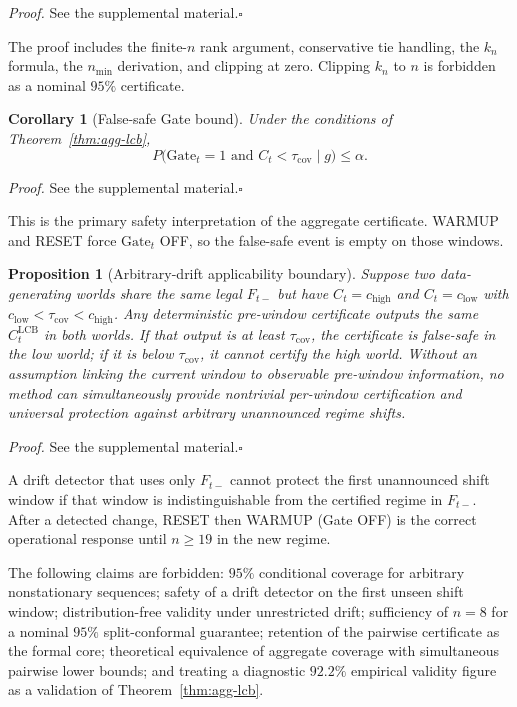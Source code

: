 \documentclass[letterpaper,journal]{IEEEtran}
\newtheorem{proposition}{Proposition}
\newtheorem{corollary}{Corollary}
\begin{document}
\noindent\emph{Proof.}
See the supplemental material.\hfill$\square$

The proof includes the finite-$n$ rank argument, conservative tie handling,
the $k_n$ formula, the $n_{\min}$ derivation, and clipping at zero.  Clipping
$k_n$ to $n$ is forbidden as a nominal $95\%$ certificate.

\begin{corollary}[False-safe Gate bound]
\label{cor:false-safe-gate}
Under the conditions of Theorem~\ref{thm:agg-lcb},
\begin{equation}
 P\bigl(\mathrm{Gate}_t=1\text{ and }C_t<\tau_{\mathrm{cov}}\mid g\bigr)
 \le\alpha.
 \label{eq:agg_cor2}
\end{equation}
\end{corollary}

\noindent\emph{Proof.}
See the supplemental material.\hfill$\square$

This is the primary safety interpretation of the aggregate certificate.
WARMUP and RESET force $\mathrm{Gate}_t$ OFF, so the false-safe event is empty
on those windows.

\begin{proposition}[Arbitrary-drift applicability boundary]
\label{prop:drift-boundary}
Suppose two data-generating worlds share the same legal $F_{t-}$ but have
$C_t=c_{\mathrm{high}}$ and $C_t=c_{\mathrm{low}}$ with
$c_{\mathrm{low}}<\tau_{\mathrm{cov}}<c_{\mathrm{high}}$.  Any deterministic
pre-window certificate outputs the same $C^{\mathrm{LCB}}_t$ in both worlds.
If that output is at least $\tau_{\mathrm{cov}}$, the certificate is
false-safe in the low world; if it is below $\tau_{\mathrm{cov}}$, it cannot
certify the high world.  Without an assumption linking the current window to
observable pre-window information, no method can simultaneously provide
nontrivial per-window certification and universal protection against
arbitrary unannounced regime shifts.
\end{proposition}

\noindent\emph{Proof.}
See the supplemental material.\hfill$\square$

A drift detector that uses only $F_{t-}$ cannot protect the first unannounced
shift window if that window is indistinguishable from the certified regime in
$F_{t-}$.  After a detected change, RESET then WARMUP (Gate OFF) is the
correct operational response until $n\ge 19$ in the new regime.

The following claims are forbidden: $95\%$ conditional coverage for arbitrary
nonstationary sequences; safety of a drift detector on the first unseen shift
window; distribution-free validity under unrestricted drift; sufficiency of
$n=8$ for a nominal $95\%$ split-conformal guarantee; retention of the pairwise
certificate as the formal core; theoretical equivalence of aggregate coverage
with simultaneous pairwise lower bounds; and treating a diagnostic $92.2\%$
empirical validity figure as a validation of Theorem~\ref{thm:agg-lcb}.
\end{document}
